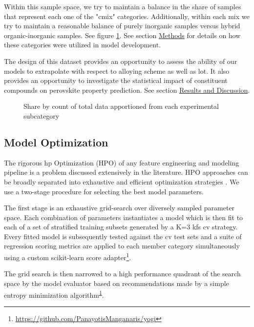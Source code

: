 \documentclass[aip, jmp, amsmath, amssymb]{revtex4-2}
\begin{document}
Within this sample space, we try to maintain a balance in the share of
samples that represent each one of the "\gls{cmix}"
categories. Additionally, within each mix we try to maintain a
reasonable balance of purely inorganic samples versus hybrid
organic-inorganic samples. See figure \ref{fig:lot_mix_org}. See section
\hyperref[sec:orga4cb79b]{Methods} for details on how these categories were utilized in model
development.

The design of this dataset provides an opportunity to assess the
ability of our models to extrapolate with respect to alloying scheme
as well as \gls{lot}. It also provides an opportunity to
investigate the statistical impact of constituent compounds on
perovskite property prediction. See section \hyperref[sec:orga74bb37]{Results and Discussion}.

 
\begin{figure}[htbp]
\centering

\caption{\label{fig:lot_mix_org} Share by count of total data apportioned from each experimental subcategory}
\end{figure}

\subsection*{Model Optimization}
\label{sec:orgc887779}
The rigorous \gls{hp} Optimization (HPO) of any feature
engineering and modeling pipeline is a problem discussed extensively
in the literature. HPO approaches can be broadly separated into
exhaustive and efficient optimization strategies
\cite{yang-2020-hyper-optim}. We use a two-stage procedure for
selecting the best model parameters.

The first stage is an exhaustive grid-search over diversely sampled
parameter space. Each combination of parameters instantiates a model
which is then fit to each of a set of stratified training subsets
generated by a K=3 \gls{kfs} \gls{cv} strategy. Every
fitted model is subsequently tested against the \gls{cv} test
sets and a suite of regression scoring metrics are applied to each
member category simultaneously using a custom scikit-learn score
adapter\footnote{\url{https://github.com/PanayotisManganaris/yogi}\label{org9b1c617}}.

The grid search is then narrowed to a high performance quadrant of the
search space by the model evaluator based on recommendations made by a
simple entropy minimization algorithm\textsuperscript{\ref{org9b1c617}}.
\end{document}

